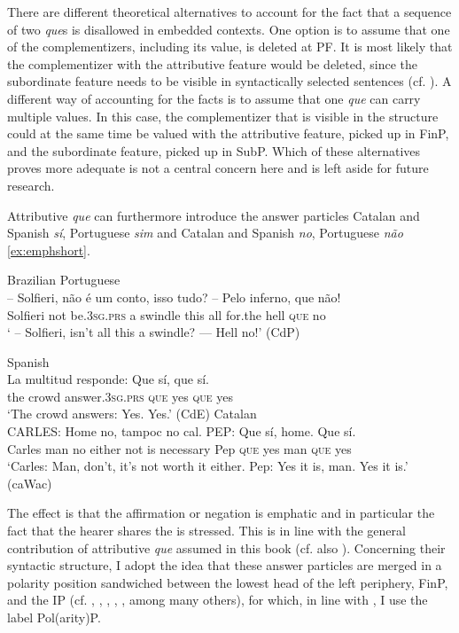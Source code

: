 There are different theoretical alternatives to account for the fact that a sequence of two \emph{que}s is disallowed in embedded contexts. One option is to assume that one of the complementizers, including its value, is deleted at PF. It is most likely that the  complementizer with the attributive feature would be deleted, since the subordinate feature needs to be visible in syntactically selected sentences (cf. ). A different way of accounting for the facts  is to assume that one \emph{que} can carry multiple values. In this case, the  complementizer that is visible in the structure could at the same time be valued with the attributive feature, picked up in FinP, and the subordinate feature, picked up in SubP. Which of these alternatives proves more  adequate is not a central concern here and is left aside for future research.


Attributive \emph{que} can furthermore introduce the answer particles Catalan and Spanish \emph{sí}, Portuguese \emph{sim} and Catalan and Spanish \emph{no},  Portuguese \emph{n\~{a}o} \eqref{ex:emphshort}. 

\ea \label{ex:emphshort} 
\ea Brazilian Portuguese\\ 
\gll -- Solfieri, não é um conto, isso tudo? -- Pelo inferno, que não! \\
 {} Solfieri not be.\textsc{3sg.prs} a swindle this all {} for.the hell \textsc{que} no \\
 \glt ` -- Solfieri, isn't all this a swindle? --- Hell no!' (CdP)

\ex
		Spanish\\
\gll La multitud responde: Que sí, que sí. \\
the crowd answer.\textsc{3sg.prs} \textsc{que} yes \textsc{que} yes\\
\glt `The crowd answers: Yes. Yes.' (CdE)
\pagebreak\ex
Catalan\\
\gll CARLES: Home no, tampoc no cal. PEP: Que sí, home. Que sí.  \\
Carles man no either not {is necessary} Pep \textsc{que} yes man \textsc{que} yes \\
\glt `Carles: Man, don't, it's not worth it either. Pep: Yes it is, man. Yes it is.' (caWac)
\z
\z

The  effect is that the  affirmation or negation is emphatic and in  particular the fact that the hearer shares the  is stressed. This is in line with the general contribution of attributive \emph{que} assumed in this book (cf. also ).  Concerning their syntactic structure, I adopt the idea that these answer particles are merged in a polarity position sandwiched between the lowest head of the left periphery, FinP, and the IP (cf. \citealt{Laka1990}, \citealt{Zanuttini1997}, \citealt{Martins2006, Martins2007,Martins2013},  \citealt{Hernanz2007}, \citealt{Batllori2008}, among many others), for which, in line with \citet{Batllori2008}, I use the label Pol(arity)P.

